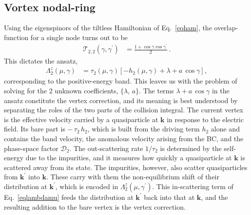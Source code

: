 \documentclass[aps,prb,onecolumn,nofootinbib,citeautoscript,10pt]{revtex4-2}
\newcommand{\bs}[1]{\boldsymbol{#1}}
\begin{document}
\subsection{Vortex nodal-ring}
\label{secrank}

Using the eigenspinors of the tiltless Hamiltonian of Eq.~\eqref{eqham}, the overlap-function for a single node turns out to be
\begin{align}
\label{eqoverlap-vnr}
{\mathcal T }_{ 2,2} (\gamma, \gamma^\prime) & = 
\frac{ 1 +  \cos \gamma \cos \gamma^\prime} {2}\,.
\end{align}
This dictates the ansatz,
\begin{align}
 {\Lambda}^z_{2} (\mu,\gamma ) & = 
\tau_{2}(\mu,\gamma)
 \left [ - h_{2} (\mu, \gamma) +\lambda + a \, \cos \gamma  \right ],
\end{align}
corresponding to the positive-energy band. This leaves us with the problem of solving for the 2 unknown
coefficients, $\lbrace \lambda , \, a    \rbrace $. 
The terms $\lambda+a\,\cos\gamma$ in the ansatz constitute the vertex correction, and its meaning is best understood by separating the roles of the two parts of the collision integral. The current vertex is the effective velocity carried by a quasiparticle at $\bs k$ in response to the electric field. Its bare part is $-\,\tau_2\,h_2$, which is built from the driving term $h_2$ alone and contains the band velocity, the anomalous velocity arising from the BC, and the phase-space factor $\mathcal D_2$. The out-scattering rate $1/\tau_2$ is determined by the self-energy due to the impurities, and it measures how quickly a quasiparticle at $\bs k$ is scattered away from its state. The impurities, however, also scatter quasiparticles from $\bs k^\prime$ into $\bs k$. These carry with them the non-equilibrium shift of their distribution at $\bs k^\prime$, which is encoded in $\Lambda^z_2(\mu,\gamma^\prime)$. This in-scattering term of Eq.~\eqref{eqlambdamu} feeds the distribution at $\bs k^\prime$ back into that at $\bs k$, and the resulting addition to the bare vertex is the vertex correction.
\end{document}
